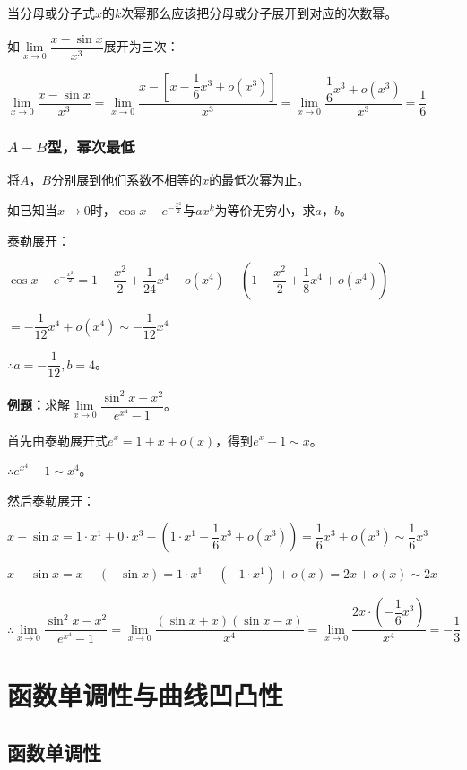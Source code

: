 \documentclass[UTF8, 12pt]{ctexart}
\begin{document}
当分母或分子式$x$的$k$次幂那么应该把分母或分子展开到对应的次数幂。\medskip

如$\lim\limits_{x\to 0}\dfrac{x-\sin x}{x^3}$展开为三次：\medskip

$\lim\limits_{x\to 0}\dfrac{x-\sin x}{x^3}=\lim\limits_{x\to 0}\dfrac{x-\left[x-\dfrac{1}{6}x^3+o(x^3)\right]}{x^3}=\lim\limits_{x\to 0}\dfrac{\dfrac{1}{6}x^3+o(x^3)}{x^3}=\dfrac{1}{6}$

\subsubsection{\texorpdfstring{$A-B$}\ 型，幂次最低}

将$A$，$B$分别展到他们系数不相等的$x$的最低次幂为止。

如已知当$x\to 0$时，$\cos x-e^{-\frac{x^2}{2}}$与$ax^k$为等价无穷小，求$a$，$b$。

泰勒展开：

$\cos x-e^{-\frac{x^2}{2}}= 1-\dfrac{x^2}{2}+\dfrac{1}{24}x^4+o(x^4)-\left(1-\dfrac{x^2}{2}+\dfrac{1}{8}x^4+o(x^4)\right)$

$=-\dfrac{1}{12}x^4+o(x^4)\sim -\dfrac{1}{12}x^4$

$\therefore a=-\dfrac{1}{12},b=4$。

\textbf{例题：}求解$\lim\limits_{x\to 0}\dfrac{\sin^2x-x^2}{e^{x^4}-1}$。

首先由泰勒展开式$e^x=1+x+o(x)$，得到$e^x-1\sim x$。

$\therefore e^{x^4}-1\sim x^4$。

然后泰勒展开：

$x-\sin x=1\cdot x^1+0\cdot x^3 - (1\cdot x^1-\dfrac{1}{6}x^3+o(x^3))= \dfrac{1}{6}x^3+o(x^3)\sim\dfrac{1}{6}x^3$

$x+\sin x=x-(-\sin x)=1\cdot x^1-(-1\cdot x^1)+o(x)=2x+o(x)\sim 2x$ \medskip

$\therefore\lim\limits_{x\to 0}\dfrac{\sin^2x-x^2}{e^{x^4}-1}=\lim\limits_{x\to 0}\dfrac{(\sin x+x)(\sin x-x)}{x^4}=\lim\limits_{x\to 0}\dfrac{2x\cdot\left(-\dfrac{1}{6}x^3\right)}{x^4}=-\dfrac{1}{3}$

\section{函数单调性与曲线凹凸性}

\subsection{函数单调性}
\end{document}
